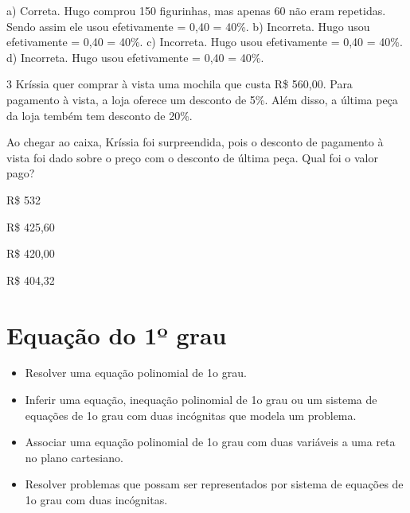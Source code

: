 {{{a) Correta. Hugo comprou 150 figurinhas, mas apenas 60 não eram repetidas.
Sendo assim ele usou efetivamente  = 0,40 = 40\%.
b) Incorreta. Hugo usou efetivamente  = 0,40 = 40\%.
c) Incorreta. Hugo usou efetivamente  = 0,40 = 40\%.
d) Incorreta. Hugo usou efetivamente  = 0,40 = 40\%.}

\num{3} Kríssia quer comprar à vista uma mochila que custa R\$ 560,00. 
Para pagamento à vista, a loja oferece um desconto de 5\%. Além disso, 
a última peça da loja tembém tem desconto de 20\%.

Ao chegar ao caixa, Kríssia foi surpreendida, pois o desconto de
pagamento à vista foi dado sobre o preço com o desconto de
última peça. Qual foi o valor pago?

\begin{escolha}

\item R\$ 532
\item R\$ 425,60
\item R\$ 420,00
\item R\$ 404,32

\end{escolha}


\pagestyle{mat}
\chapter{Equação do 1º grau}


\begin{itemize}

  \item Resolver uma equação polinomial de 1o grau.
  \item Inferir uma equação, inequação polinomial de 1o grau ou um sistema de
equações de 1o grau com duas incógnitas que modela um problema.
  \item Associar uma equação polinomial de 1o grau com duas variáveis a uma
reta no plano cartesiano.
  \item Resolver problemas que possam ser representados por sistema de
equações de 1o grau com duas incógnitas. 


\end{itemize}}}
